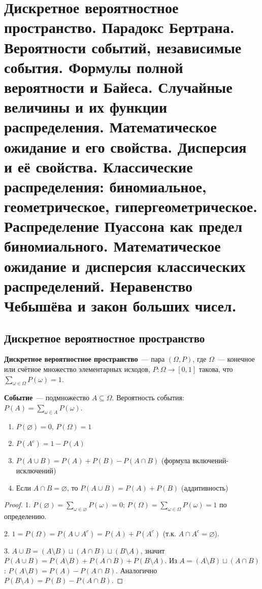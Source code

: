 \documentclass[12pt]{article}
\begin{document}
	\newpage
	
	\section{Дискретное вероятностное пространство. Парадокс Бертрана. Вероятности событий, независимые события. Формулы полной вероятности и Байеса. Случайные величины и их функции распределения. Математическое ожидание и его свойства. Дисперсия и её свойства. Классические распределения: биномиальное, геометрическое, гипергеометрическое. Распределение Пуассона как предел биномиального. Математическое ожидание и дисперсия классических распределений. Неравенство Чебышёва и закон больших чисел.}
	
	\subsection{Дискретное вероятностное пространство}
	
	\begin{definition}
		\textbf{Дискретное вероятностное пространство}~--- пара $(\Omega, P)$, где $\Omega$~--- конечное или счётное множество элементарных исходов, $P: \Omega \to [0, 1]$ такова, что $\sum_{\omega \in \Omega} P(\omega) = 1$.
	\end{definition}
	
	\begin{definition}
		\textbf{Событие}~--- подмножество $A \subseteq \Omega$. Вероятность события: $P(A) = \sum_{\omega \in A} P(\omega)$.
	\end{definition}
	
	\begin{theorem}
		\begin{enumerate}
			\item $P(\varnothing) = 0$, $P(\Omega) = 1$
			\item $P(A^c) = 1 - P(A)$
			\item $P(A \cup B) = P(A) + P(B) - P(A \cap B)$ (формула включений-исключений)
			\item Если $A \cap B = \varnothing$, то $P(A \cup B) = P(A) + P(B)$ (аддитивность)
		\end{enumerate}
	\end{theorem}
	
	\begin{proof}
		1. $P(\varnothing) = \sum_{\omega \in \varnothing} P(\omega) = 0$; $P(\Omega) = \sum_{\omega \in \Omega} P(\omega) = 1$ по определению.
		
		2. $1 = P(\Omega) = P(A \cup A^c) = P(A) + P(A^c)$ (т.к. $A \cap A^c = \varnothing$).
		
		3. $A \cup B = (A \setminus B) \sqcup (A \cap B) \sqcup (B \setminus A)$, значит $P(A \cup B) = P(A \setminus B) + P(A \cap B) + P(B \setminus A)$. Из $A = (A \setminus B) \sqcup (A \cap B)$: $P(A \setminus B) = P(A) - P(A \cap B)$. Аналогично $P(B \setminus A) = P(B) - P(A \cap B)$.
	\end{proof}
	
\end{document}
